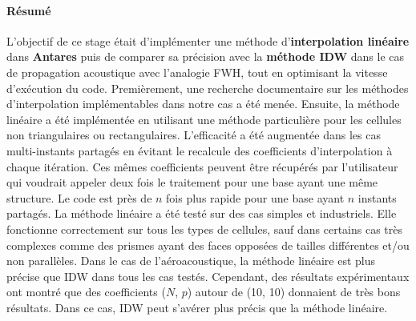 \cleardoublepage
\paragraph{Résumé}
\vspace{0,5cm}
L'objectif de ce stage était d'implémenter une méthode d'\textbf{interpolation linéaire} dans \textbf{Antares} puis de comparer sa précision avec la \textbf{méthode IDW} dans le cas de propagation acoustique avec l'analogie FWH, tout en optimisant la vitesse d'exécution du code.
Premièrement, une recherche documentaire sur les méthodes d'interpolation implémentables dans notre cas a été menée.
Ensuite, la méthode linéaire a été implémentée en utilisant une méthode particulière pour les cellules non triangulaires ou rectangulaires.
L'efficacité a été augmentée dans les cas multi-instants partagés en évitant le recalcule des coefficients d'interpolation à chaque itération. Ces mêmes coefficients peuvent être récupérés par l'utilisateur qui voudrait appeler deux fois le traitement pour une base ayant une même structure.
Le code est près de \(n\) fois plus rapide pour une base ayant \(n\) instants partagés.
La méthode linéaire a été testé sur des cas simples et industriels. Elle fonctionne correctement sur tous les types de cellules, sauf dans certains cas très complexes comme des prismes ayant des faces opposées de tailles différentes et/ou non parallèles.
Dans le cas de l'aéroacoustique, la méthode linéaire est plus précise que IDW dans tous les cas testés. Cependant, des résultats expérimentaux ont montré que des coefficients (\(N\), \(p\)) autour de (10, 10) donnaient de très bons résultats. Dans ce cas, IDW peut s'avérer plus précis que la méthode linéaire.

